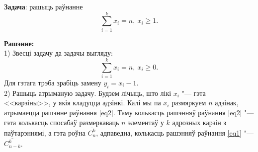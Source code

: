 \documentclass[12pt,twoside]{article}
\begin{document}
    \noindent \textbf{Задача}: рашыць раўнанне
    \begin{equation} \label{eq1}
    \sum _{i=1} ^k x_i = n,\ x_i \ge 1.
    \end{equation}
    
    \noindent \textbf{Рашэнне:} \\
    1) Звесці задачу да задачы выгляду: 
    \begin{equation} \label{eq2}
    \sum _{i=1} ^k x_i = n,\ x_i \ge 0.
    \end{equation}
    Для гэтага трэба зрабіць замену $y_i=x_i-1$. \\
    2) Рашыць атрыманую задачу. Будзем лічыць, што лікі $x_i$ "--- гэта <<карзіны>>, у якія кладуцца адзінкі. Калі мы па $x_i$ размяркуем $n$ адзінак, атрымаецца рашэнне раўнання \eqref{eq2}. Таму колькасць рашэнняў раўнання \eqref{eq2} "--- гэта колькасць спосабаў размеркаваць $n$ элементаў у $k$ адрозных карзін з паўтарэннямі, а гэта роўна $\overline{C_n ^k}$, адпаведна, колькасць рашэнняў раўнання \eqref{eq1} "--- $\overline{C_{n-k} ^k}$.
\end{document}
